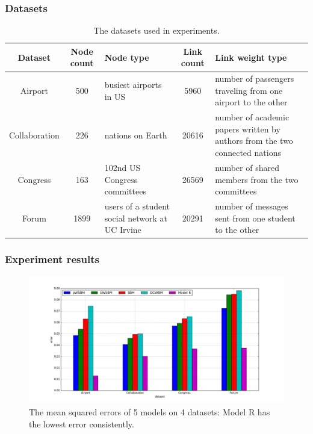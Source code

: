 \documentclass{article}
\begin{document}
\subsubsection{Datasets}
\begin{table}[H]\centering
	\caption{The datasets used in experiments.}
	\begin{tabularx}{\textwidth}{|c|c|X|c|X|}  \hline \rowcolor{blue!40}
		Dataset & Node count & Node type & Link count & Link weight type \\ \hline
		Airport & 500 & busiest airports in US & 5960 & number of passengers traveling from one airport to the other\\ \hline
		Collaboration & 226 & nations on Earth & 20616 & number of academic papers written by authors from the two connected nations \\ \hline
		Congress & 163  & 102nd US Congress committees & 26569 & number of shared members from the two committees \\ \hline
		Forum  & 1899 & users of a student social network at UC Irvine & 20291 & number of messages sent from one student to the other \\ \hline
	\end{tabularx}
	\label{tab:datasets}
\end{table}

\subsubsection{Experiment results}

\begin{figure}[H]\centering
	\includegraphics[width=\textwidth]{link-weight-errors}
	\caption{
		The mean squared errors of 5 models on 4 datasets:
		Model R has the lowest error consistently.
	}
	\label{fig:errors}
\end{figure}
\end{document}
